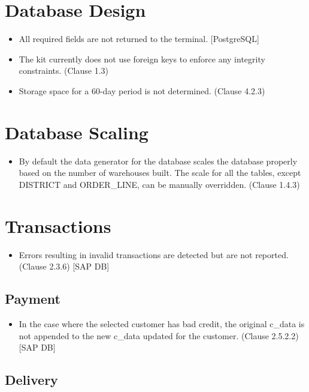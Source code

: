 \documentclass{article}
\begin{document}
\section{Database Design}

\begin{itemize}
\item All required fields are not returned to the terminal. [PostgreSQL]
\item The kit currently does not use foreign keys to enforce any integrity
      constraints.  (Clause 1.3)
\item Storage space for a 60-day period is not determined.  (Clause 4.2.3)
\end{itemize}

\section{Database Scaling}

\begin{itemize}
\item By default the data generator for the database scales the database
      properly based on the number of warehouses built.  The scale for all
      the tables, except DISTRICT and ORDER\_LINE, can be manually overridden.
      (Clause 1.4.3)
\end{itemize}

\section{Transactions}

\begin{itemize}
\item Errors resulting in invalid transactions are detected but are not
      reported.  (Clause 2.3.6) [SAP DB]
\end{itemize}

\subsection{Payment}

\begin{itemize}
\item In the case where the selected customer has bad credit,
      the original c\_data is not appended to the new c\_data updated for the
      customer.  (Clause 2.5.2.2) [SAP DB]
\end{itemize}

\subsection{Delivery}
\end{document}
